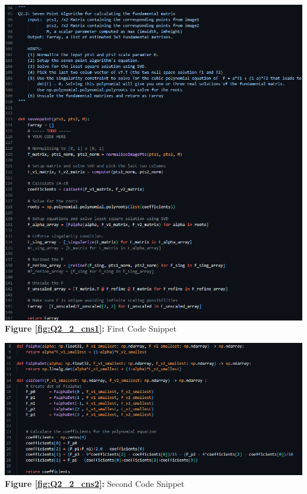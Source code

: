 \begin{your_solution}[title=Q2.2,height=21.5cm,width=\linewidth]
\begin{minipage}{0.48\linewidth}
	\centering
	\includegraphics[width=\linewidth]{../Q2_2_cns1.png}
	\textbf{Figure \ref{fig:Q2_2_cns1}:} First Code Snippet  %
	\label{fig:Q2_2_cns1}         %
\end{minipage}
\hfill
\begin{minipage}{0.48\linewidth}
	\centering
	\includegraphics[width=\linewidth]{../Q2_2_cns2.png}
	\textbf{Figure \ref{fig:Q2_2_cns2}:} Second Code Snippet  %
	\label{fig:Q2_2_cns2}         %
\end{minipage}	
\newline
\end{your_solution}
